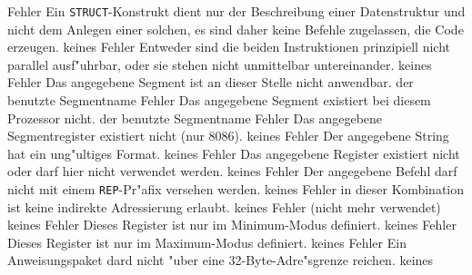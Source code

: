 \documentclass[12pt,a4paper,twoside]{report}
\newcommand{\tty}[1]{{\tt #1}}
\begin{document}
{\begin{description}
               {Fehler}
               {Ein \tty{STRUCT}-Konstrukt dient nur der Beschreibung
                einer Datenstruktur und nicht dem Anlegen einer solchen,
                es sind daher keine Befehle zugelassen, die Code erzeugen.}
               {keines}
               {Fehler}
               {Entweder sind die beiden Instruktionen
                prinzipiell nicht parallel ausf"uhrbar, oder sie stehen nicht
                unmittelbar untereinander.}
               {keines}
               {Fehler}
               {Das angegebene Segment ist an dieser Stelle
                nicht anwendbar.}
               {der benutzte Segmentname}
               {Fehler}
               {Das angegebene Segment existiert bei
                diesem Prozessor nicht.}
               {der benutzte Segmentname}
               {Fehler}
               {Das angegebene Segmentregister existiert
                nicht (nur 8086).}
               {keines}
               {Fehler}
               {Der angegebene String hat ein ung"ultiges
                Format.}
               {keines}
               {Fehler}
               {Das angegebene Register existiert nicht oder
                darf hier nicht verwendet werden.}
               {keines}
               {Fehler}
               {Der angegebene Befehl darf nicht mit einem
                \tty{REP}-Pr"afix versehen werden.}
               {keines}
               {Fehler}
               {in dieser Kombination ist keine indirekte
                Adressierung erlaubt.}
               {keines}
               {Fehler}
               {(nicht mehr verwendet)}
               {keines}
               {Fehler}
               {Dieses Register ist nur im Minimum-Modus
                definiert.}
               {keines}
               {Fehler}
               {Dieses Register ist nur im Maximum-Modus
                definiert.}
               {keines}
               {Fehler}
               {Ein Anweisungspaket dard nicht "uber eine
                32-Byte-Adre"sgrenze reichen.}
               {keines}

\end{description}}
\end{document}
